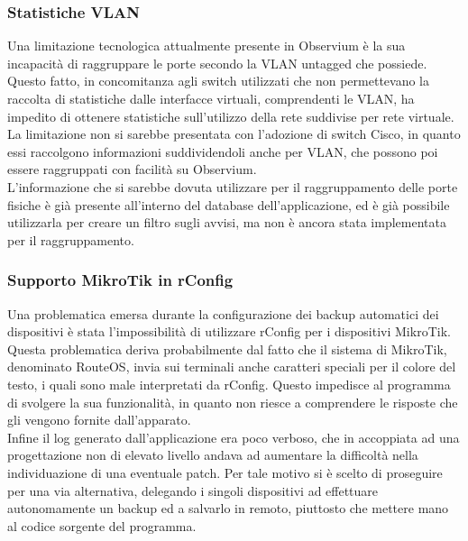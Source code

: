 \documentclass[Tesi.tex]{subfiles}
\begin{document}
\subsubsection{Statistiche VLAN}
Una limitazione tecnologica attualmente presente in Observium è la sua incapacità di raggruppare le porte secondo la VLAN untagged che possiede. \\
Questo fatto, in concomitanza agli switch utilizzati che non permettevano la raccolta di statistiche dalle interfacce virtuali, comprendenti le VLAN, ha impedito di ottenere statistiche sull'utilizzo della rete suddivise per rete virtuale. \\
La limitazione non si sarebbe presentata con l'adozione di switch Cisco, in quanto essi raccolgono informazioni suddividendoli anche per VLAN, che possono poi essere raggruppati con facilità su Observium. \\
L'informazione che si sarebbe dovuta utilizzare per il raggruppamento delle porte fisiche è già presente all'interno del database dell'applicazione, ed è già possibile utilizzarla per creare un filtro sugli avvisi, ma non è ancora stata implementata per il raggruppamento.

\subsubsection{Supporto MikroTik in rConfig}
Una problematica emersa durante la configurazione dei backup automatici dei dispositivi è stata l'impossibilità di utilizzare rConfig per i dispositivi MikroTik. \\
Questa problematica deriva probabilmente dal fatto che il sistema di MikroTik, denominato RouteOS, invia sui terminali anche caratteri speciali per il colore del testo, i quali sono male interpretati da rConfig. Questo impedisce al programma di svolgere la sua funzionalità, in quanto non riesce a comprendere le risposte che gli vengono fornite dall'apparato. \\
Infine il log generato dall'applicazione era poco verboso, che in accoppiata ad una progettazione non di elevato livello andava ad aumentare la difficoltà nella individuazione di una eventuale patch. Per tale motivo si è scelto di proseguire per una via alternativa, delegando i singoli dispositivi ad effettuare autonomamente un backup ed a salvarlo in remoto, piuttosto che mettere mano al codice sorgente del programma.
\end{document}
